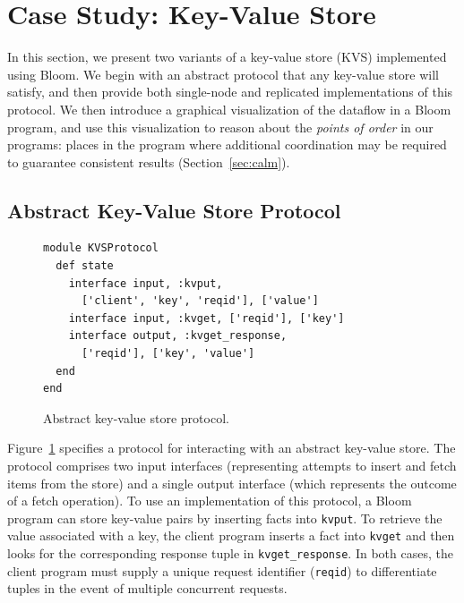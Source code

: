 \section{Case Study: Key-Value Store}
\label{sec:kvs}
In this section, we present two variants of a key-value store (KVS) implemented
using Bloom. We begin with an abstract protocol that any key-value store will
satisfy, and then provide both single-node and replicated implementations of
this protocol. We then introduce a graphical visualization of the dataflow in a
Bloom program, and use this visualization to reason about the \emph{points of
  order} in our programs: places in the program where additional coordination
may be required to guarantee consistent results (Section~\ref{sec:calm}).

\subsection{Abstract Key-Value Store Protocol}

\begin{figure}[t]
\begin{scriptsize}
\begin{lstlisting}
module KVSProtocol
  def state
    interface input, :kvput, 
      ['client', 'key', 'reqid'], ['value']
    interface input, :kvget, ['reqid'], ['key']
    interface output, :kvget_response, 
      ['reqid'], ['key', 'value']
  end
end
\end{lstlisting}
\centering
\vspace{-10pt}
\caption{Abstract key-value store protocol.}
\label{fig:kvs-proto}
\end{scriptsize}
\vspace{-2pt}
\end{figure}

Figure~\ref{fig:kvs-proto} specifies a protocol for interacting with an abstract
key-value store. The protocol comprises two input interfaces (representing
attempts to insert and fetch items from the store) and a single output interface
(which represents the outcome of a fetch operation). To use an implementation of
this protocol, a Bloom program can store key-value pairs by inserting facts into
\texttt{kvput}. To retrieve the value associated with a key, the client program
inserts a fact into \texttt{kvget} and then looks for the corresponding response
tuple in \texttt{kvget\_response}. In both cases, the client program must supply
a unique request identifier (\texttt{reqid}) to differentiate tuples in the
event of multiple concurrent requests.

